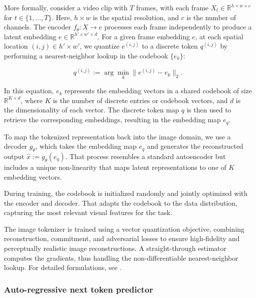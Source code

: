 More formally, consider a video clip with $T$ frames, with each frame $X_t \in \mathbb{R}^{h \times w \times c}$ for $t \in \{1, \dots, T\}$. Here, $h \times w$ is the spatial resolution, and $c$ is the number of channels. The encoder $f_{\theta} : X \rightarrow e$ processes each frame independently to produce a latent embedding $e \in \mathbb{R}^{h' \times w' \times d}$. For a given frame embedding $e$, at each spatial location $(i,j) \in h' \times w'$, we quantize $e^{(i,j)}$ to a discrete token $q^{(i,j)}$ by performing a nearest-neighbor lookup in the codebook $\{e_k\}$:

\begin{equation}
q^{(i,j)} := \arg \min_k \| e^{(i,j)} - e_k \|_2.
\label{eq:nn-lookup}
\end{equation}

In this equation, $e_k$ represents the embedding vectors in a shared codebook of size $\mathbb{R}^{K \times d}$, where $K$ is the number of discrete entries or codebook vectors, and $d$ is the dimensionality of each vector. The discrete token map $q$ is then used to retrieve the corresponding embeddings, resulting in the embedding map $e_q$.

To map the tokenized representation back into the image domain, we use a decoder $g_{\theta}$, which takes the embedding map $e_q$ and generates the reconstructed output $\hat{x} := g_{\theta}(e_q)$.
That process resembles a standard autoencoder but includes a unique non-linearity that maps latent representations to one of $K$ embedding vectors.

During training, the codebook is initialized randomly and jointly optimized with the encoder and decoder. That adapts the codebook to the data distribution, capturing the most relevant visual features for the task.



The image tokenizer is trained using a vector quantization objective, combining reconstruction, commitment, and adversarial losses to ensure high-fidelity and perceptually realistic image reconstructions. A straight-through estimator computes the gradients, thus handling the non-differentiable nearest-neighbor lookup. For detailed formulations, see \cite{sun2024llamagen}.



\subsubsection{Auto-regressive next token predictor}
\label{sec:model:vm:autoregressive}

